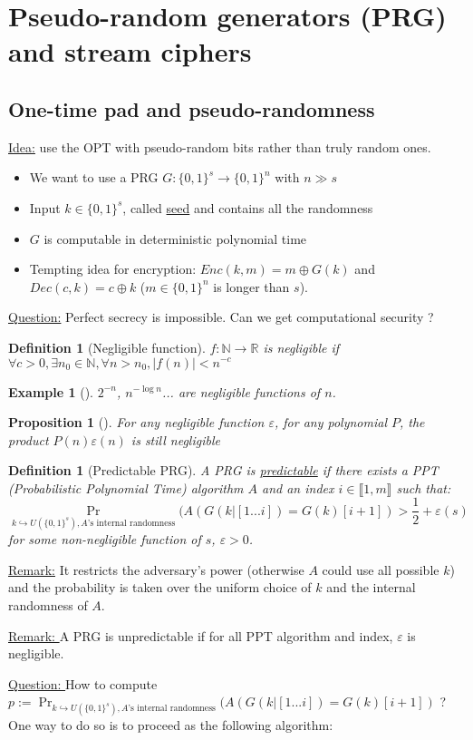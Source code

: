 \documentclass{article}
\newtheorem{prop}[thm]{Proposition}
\newtheorem{defi}[thm]{Definition}
\newtheorem{ex}[thm]{Example}
\newcommand{\Ex}[3]{\begin{ex}[#1]\label{#2}#3\end{ex}}
\newcommand{\Def}[3]{\begin{defi}[#1]\label{#2}#3\end{defi}}
\newcommand{\Prop}[3]{\begin{prop}[#1]\label{#2}#3\end{prop}}
\newcommand{\R}{\mathbb{R}}
\newcommand{\N}{\mathbb{N}}
\renewcommand{\epsilon}{\varepsilon}
\begin{document}
\section{Pseudo-random generators (PRG) and stream ciphers}
\subsection{One-time pad and pseudo-randomness}
\underline{Idea:} use the OPT with pseudo-random bits rather than truly random ones.

\begin{itemize}
\item We want to use a PRG $G:\{0,1\}^s\rightarrow\{0,1\}^n$ with $n\gg s$
\item Input $k\in\{0,1\}^s$, called \underline{seed} and contains all the randomness
\item $G$ is computable in deterministic polynomial time
\item Tempting idea for encryption: $Enc(k,m) = m\oplus G(k)$ and $Dec(c,k) = c\oplus k$ ($m\in\{0,1\}^n$ is longer than $s$).
\end{itemize}
\underline{Question:} Perfect secrecy is impossible. Can we get computational security ?

\Def{Negligible function}{def:negligFunc}{$f:\N\rightarrow\R$ is negligible if $\forall c>0,\exists n_0\in\N, \forall n>n_0,|f(n)|<n^{-c}$}

\Ex{}{}{$2^{-n}$, $n^{-\log n}$... are negligible functions of $n$.}

\Prop{}{}{For any negligible function $\epsilon$, for any polynomial $P$, the product $P(n)\epsilon(n)$ is still negligible}

\Def{Predictable PRG}{def:predPRG}{
A PRG is \underline{predictable} if there exists a PPT (Probabilistic Polynomial Time) algorithm $A$ and an index $i\in\llbracket1,m\rrbracket$ such that:
\[\Pr_{k\hookrightarrow U(\{0,1\}^s), \text{$A$'s internal randomness}}(A(G(k|[1...i])=G(k)[i+1])>\frac{1}{2}+\epsilon(s)\]
for some non-negligible function of $s$, $\epsilon>0$.}
\underline{Remark:} It restricts the adversary's power (otherwise $A$ could use all possible $k$) and the probability is taken over the uniform choice of $k$ and the internal randomness of $A$.

\underline{Remark: } A PRG is unpredictable if for all PPT algorithm and index, $\epsilon$ is negligible.

\underline{Question: } How to compute $p:=\Pr_{k\hookrightarrow U(\{0,1\}^s), \text{$A$'s internal randomness}}(A(G(k|[1...i])=G(k)[i+1])$ ? One way to do so is to proceed as the following algorithm:\\
\end{document}
